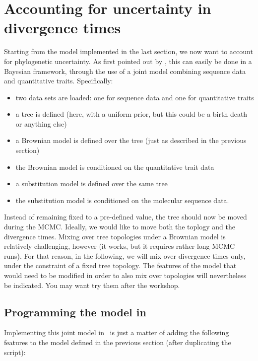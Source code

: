 \section{Accounting for uncertainty in divergence times}

Starting from the model implemented in the last section, we now want to account for phylogenetic uncertainty. As first pointed out by \cite{Huelsenbeck:2003p999}, this can easily be done in a Bayesian framework, through the use of a joint model combining sequence data and quantitative traits. Specifically:
\begin{itemize}
\item
two data sets are loaded: one for sequence data and one for quantitative traits
\item
a tree is defined (here, with a uniform prior, but this could be a birth death or anything else)
\item
a Brownian model is defined over the tree (just as described in the previous section)
\item
the Brownian model is conditioned on the quantitative trait data
\item
a substitution model is defined over the same tree
\item
the substitution model is conditioned on the molecular sequence data.
\end{itemize}
Instead of remaining fixed to a pre-defined value,
the tree should now be moved during the MCMC.
Ideally, we would like to move both the toplogy and the divergence times.
Mixing over tree topologies under a Brownian model is relatively challenging, however
(it works, but it requires rather long MCMC runs).
For that reason, in the following, we will mix over divergence times only,
under the constraint of a fixed tree topology.
The features of the model that would need to be modified in order to also mix over topologies
will nevertheless be indicated. You may want try them after the workshop.

\subsection{Programming the model in \RevBayes}

Implementing this joint model in \RevBayes~is just a matter of
adding the following features to the model defined in the previous section
(after duplicating the script):

